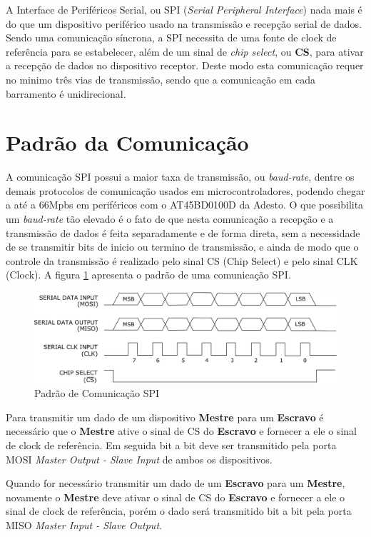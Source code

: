 A Interface de Periféricos Serial, ou SPI (\emph{Serial Peripheral Interface}) nada mais é do que um dispositivo periférico usado na transmissão e recepção serial de dados. Sendo uma comunicação síncrona, a SPI necessita de uma fonte de clock de referência para se estabelecer, além de um sinal de \emph{chip select}, ou \textbf{CS}, para ativar a recepção de dados no dispositivo receptor. Deste modo esta comunicação requer no minimo três vias de transmissão, sendo que a comunicação em cada barramento é unidirecional.

\section{Padrão da Comunicação}

A comunicação SPI possui a maior taxa de transmissão, ou \emph{baud-rate}, dentre os demais protocolos de comunicação usados em microcontroladores, podendo chegar a até a 66Mpbs em periféricos com o AT45BD0100D da Adesto. O que possibilita um  \emph{baud-rate} tão elevado é o fato de que nesta comunicação a recepção e a transmissão de dados é feita separadamente e de forma direta, sem a necessidade de se transmitir bits de inicio ou termino de transmissão, e ainda de modo que o controle da transmissão é realizado pelo sinal CS (Chip Select) e pelo sinal  CLK (Clock).  A figura \ref{fig:SPI} apresenta o padrão de uma comunicação SPI.

\begin{figure}[H]
	\centering
	\includegraphics[width=1\textwidth] {figuras/PadraoSPI.eps}
	\caption{Padrão de Comunicação SPI}
	\label{fig:SPI}
\end{figure}

Para transmitir um dado de um dispositivo \textbf{Mestre} para um \textbf{Escravo} é necessário que o \textbf{Mestre} ative o sinal de CS do \textbf{Escravo} e fornecer a ele o sinal de clock de referência. Em seguida bit a bit deve ser transmitido pela porta MOSI \emph{Master Output - Slave Input} de ambos os dispositivos. 

Quando for necessário transmitir um dado de um  \textbf{Escravo} para um \textbf{Mestre}, novamente o \textbf{Mestre} deve ativar o sinal de CS do  \textbf{Escravo} e fornecer a ele o sinal de clock de referência, porém o dado será transmitido bit a bit pela porta MISO \emph{Master Input - Slave Output}. 

